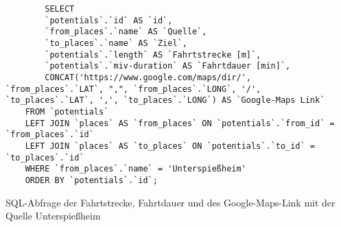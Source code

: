 \begin{listing}[htbp]
    \begin{verbatim}
        SELECT 
        `potentials`.`id` AS `id`, 
        `from_places`.`name` AS `Quelle`,
        `to_places`.`name` AS `Ziel`, 
        `potentials`.`length` AS `Fahrtstrecke [m]`, 
        `potentials`.`miv-duration` AS `Fahrtdauer [min]`,
        CONCAT('https://www.google.com/maps/dir/', `from_places`.`LAT`, ",", `from_places`.`LONG`, '/', `to_places`.`LAT`, ',', `to_places`.`LONG`) AS `Google-Maps Link`
    FROM `potentials`
    LEFT JOIN `places` AS `from_places` ON `potentials`.`from_id` = `from_places`.`id`
    LEFT JOIN `places` AS `to_places` ON `potentials`.`to_id` = `to_places`.`id`
    WHERE `from_places`.`name` = 'Unterspießheim'
    ORDER BY `potentials`.`id`;
    \end{verbatim}
    \caption{SQL-Abfrage der Fahrtstrecke, Fahrtdauer und des Google-Maps-Link mit der Quelle Unterspießheim}\label{lst-f-unterspiessheim}
\end{listing}